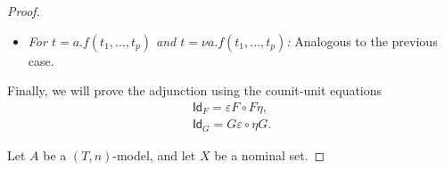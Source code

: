 \documentclass[a4paper,UKenglish,cleveref,thm-restate,numberwithinsect,final]{lipics-v2021}
\newcommand{\Id}{\mathsf{Id}}
\theoremstyle{plain}
\numberwithin{equation}{section}
\newcommand{\+}[1]{\mathcal{#1}\xspace}
\theoremstyle{definition}
\begin{document}
\begin{proof}
\begin{itemize}
\begin{align*}
                &h_m(f_{A, m'}((\varepsilon_A)_{m'}([t_1]_{m'}), \ldots, (\varepsilon_A)_{m'}([t_p]_{m'}))) \\
                =~&\quad\text{(homomorphy)} \\
                &h_m((\varepsilon_A)_m(f_{FA_0, m'}([t_1]_{m'}, \ldots, [t_p]_{m'}))) \\
                =~&\quad\text{(definition)} \\
                &h_m((\varepsilon_A)_m([f(t_1, \ldots, t_p)]_{m})).
            \end{align*}
        \item
            \textit{For \(t = a.f(t_1, \ldots, t_p)\) and \(t = \nu a.f(t_1, \ldots, t_p)\):}
            Analogous to the previous case.
    \end{itemize}

    Finally, we will prove the adjunction using the counit-unit equations
    \begin{gather}
        \Id_F = \varepsilon F \circ F \eta, \label{eq:counitunit1} \\
        \Id_G = G \varepsilon \circ \eta G. \label{eq:counitunit2}
    \end{gather}

    Let \(A\) be a $(T,n)$-model, and let \(X\) be a nominal set.


\end{proof}
\end{document}
